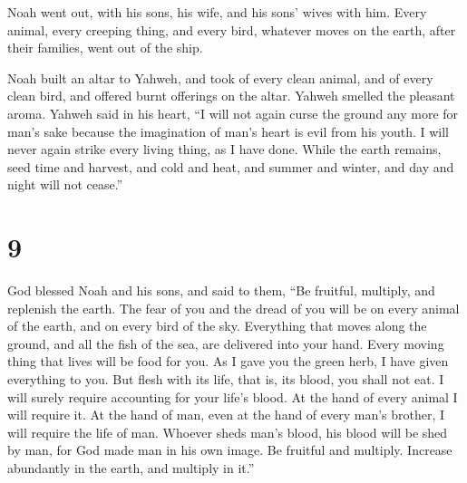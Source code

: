  Noah went out, with his sons, his wife, and his sons'
wives with him.  Every animal, every creeping thing, and
every bird, whatever moves on the earth, after their families, went out
of the ship.

 Noah built an altar to Yahweh, and took of every clean
animal, and of every clean bird, and offered burnt offerings on the
altar.  Yahweh smelled the pleasant aroma. Yahweh said in
his heart, ``I will not again curse the ground any more for man's sake
because the imagination of man's heart is evil from his youth. I will
never again strike every living thing, as I have done. 
While the earth remains, seed time and harvest, and cold and heat, and
summer and winter, and day and night will not cease.''

\hypertarget{section-8}{%
\section{9}\label{section-8}}

 God blessed Noah and his sons, and said to them, ``Be
fruitful, multiply, and replenish the earth.  The fear of
you and the dread of you will be on every animal of the earth, and on
every bird of the sky. Everything that moves along the ground, and all
the fish of the sea, are delivered into your hand.  Every
moving thing that lives will be food for you. As I gave you the green
herb, I have given everything to you.  But flesh with its
life, that is, its blood, you shall not eat.  I will
surely require accounting for your life's blood. At the hand of every
animal I will require it. At the hand of man, even at the hand of every
man's brother, I will require the life of man.  Whoever
sheds man's blood, his blood will be shed by man, for God made man in
his own image.  Be fruitful and multiply. Increase
abundantly in the earth, and multiply in it.''

